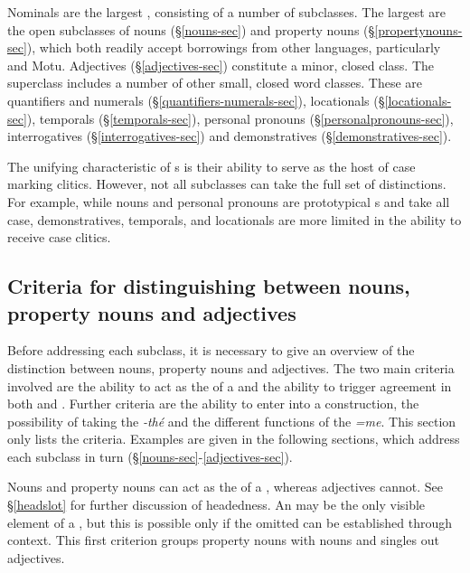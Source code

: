 Nominals are the largest , consisting of a number of subclasses. The largest are the open subclasses of nouns ({\S}\ref{nouns-sec}) and property nouns ({\S}\ref{propertynouns-sec}), which both readily accept borrowings from other languages, particularly  and Motu. Adjectives ({\S}\ref{adjectives-sec}) constitute a minor, closed class. The  superclass includes a number of other small, closed word classes. These are quantifiers and numerals ({\S}\ref{quantifiers-numerals-sec}), locationals ({\S}\ref{locationals-sec}), temporals ({\S}\ref{temporals-sec}), personal pronouns ({\S}\ref{personalpronouns-sec}), interrogatives ({\S}\ref{interrogatives-sec}) and demonstratives ({\S}\ref{demonstratives-sec}).

The unifying characteristic of s is their ability to serve as the host of case marking clitics. However, not all  subclasses can take the full set of  distinctions. For example, while nouns and personal pronouns are prototypical s and take all case, demonstratives, temporals, and locationals are more limited in the ability to receive case clitics.

\subsection[Overview of criteria]{Criteria for distinguishing between nouns, property nouns and adjectives} \label{criteria-nominals-sec}

Before addressing each subclass, it is necessary to give an overview of the distinction between nouns, property nouns and adjectives. The two main criteria involved are the ability to act as the  of a  and the ability to trigger agreement in both  and . Further criteria are the ability to enter into a  construction, the possibility of taking the  \emph{-thé} and the different functions of the   \emph{=me}. This section only lists the criteria. Examples are given in the following sections, which address each subclass in turn ({\S}\ref{nouns-sec}-\ref{adjectives-sec}).

Nouns and property nouns can act as the  of a , whereas adjectives cannot. See {\S}\ref{headslot} for further discussion of headedness. An  may be the only visible element of a , but this is possible only if the omitted  can be established through context. This first criterion groups property nouns with nouns and singles out adjectives.

